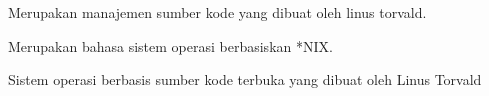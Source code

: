 Merupakan manajemen sumber kode yang dibuat oleh linus torvald.

Merupakan bahasa sistem operasi berbasiskan *NIX.

Sistem operasi berbasis sumber kode terbuka yang dibuat oleh Linus Torvald